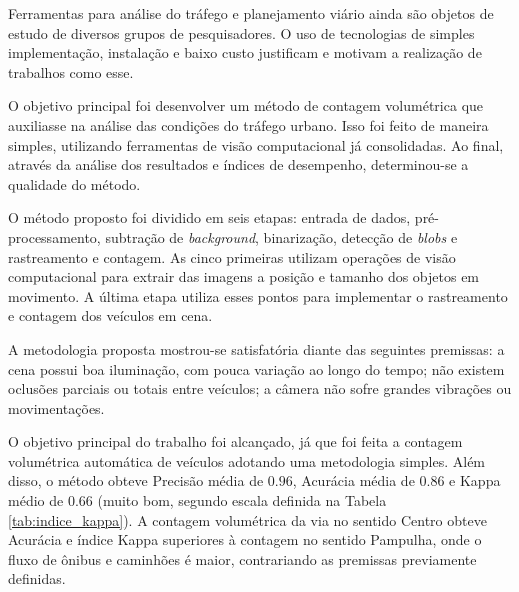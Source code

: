 


Ferramentas para análise do tráfego e planejamento viário ainda são objetos de estudo de diversos grupos de pesquisadores. O uso de tecnologias de simples implementação, instalação e baixo custo justificam e motivam a realização de trabalhos como esse.

O objetivo principal foi desenvolver um método de contagem volumétrica que auxiliasse na análise das condições do tráfego urbano. Isso foi feito de maneira simples, utilizando ferramentas de visão computacional já consolidadas. Ao final, através da análise dos resultados e índices de desempenho, determinou-se a qualidade do método.

O método proposto foi dividido em seis etapas: entrada de dados, pré-processamento, subtração de \textit{background}, binarização, detecção de \textit{blobs} e rastreamento e contagem. As cinco primeiras utilizam operações de visão computacional para extrair das imagens a posição e tamanho dos objetos em movimento. A última etapa utiliza esses pontos para implementar o rastreamento e contagem dos veículos em cena.

A metodologia proposta mostrou-se satisfatória diante das seguintes premissas: a cena possui boa iluminação, com pouca variação ao longo do tempo; não existem oclusões parciais ou totais entre veículos; a câmera não sofre grandes vibrações ou movimentações.

O objetivo principal do trabalho foi alcançado, já que foi feita a contagem volumétrica automática de veículos adotando uma metodologia simples. Além disso, o método obteve Precisão média de $0.96$, Acurácia média de $0.86$ e Kappa médio de $0.66$ (muito bom, segundo escala definida na Tabela \ref{tab:indice_kappa}). A contagem volumétrica da via no sentido Centro obteve Acurácia e índice Kappa superiores à contagem no sentido Pampulha, onde o fluxo de ônibus e caminhões é maior, contrariando as premissas previamente definidas.

